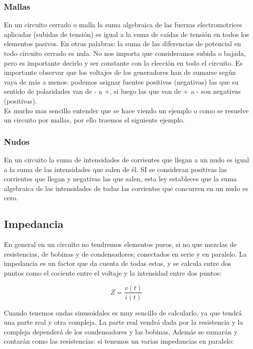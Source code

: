 \documentclass[12pt]{article}
\begin{document}
\subsubsection{Mallas}

En un circuito cerrado o malla la suma algebraica de las fuerzas electromotrices aplicadas (subidas de tensión) es igual a la suma de caídas de tensión en todos los elementos pasivos. En otras palabras: la suma de las diferencias de potencial en todo circuito cerrado es nula. No nos importa que consideramos subida o bajada, pero es importante decirlo y ser constante con la elección en todo el circuito. Es importante observar que los voltajes de los generadores han de sumarse según vaya de más a menos: podemos asignar fuentes positivas (negativas) las que su sentido de polaridades van de - a +, si luego las que van de + a - son negativas (positivas). \\

Es mucho mas sencillo entender que se hace viendo un ejemplo o como se resuelve un circuito por mallas, por ello traemos el siguiente ejemplo.

\subsubsection{Nudos}

En un circuito la suma de intensidades de corrientes que llegan a un nudo es igual a la suma de las intensidades que salen de él. SI se consideran positivas las corrientes que llegan y negativas las que salen, esta ley estableces que la suma algebraica de las intensidades de todas las corrientes que concurren en un nudo es cero. 


\subsection{Impedancia}

En general en un circuito no tendremos elementos puros, si no que mezclas de resistencias, de bobinas y de condensadores; conectados en serie y en paralelo. La impedancia es un factor que da cuenta de todas estas, y se calcula entre dos puntos como el cociente entre el voltaje y la intensidad entre dos puntos:

\begin{equation}
Z = \dfrac{v(t)}{i(t)}
\end{equation}

 Cuando tenemos ondas sinusoidales es muy sencillo de calcularlo, ya que tendrá una parte real y otra compleja. La parte real vendrá dada por la resistencia y la compleja dependerá de los condensadores y las bobinas. Además se sumarán y contarán como las resistencias: si tenemos un varias impedancias en paralelo:
\end{document}

